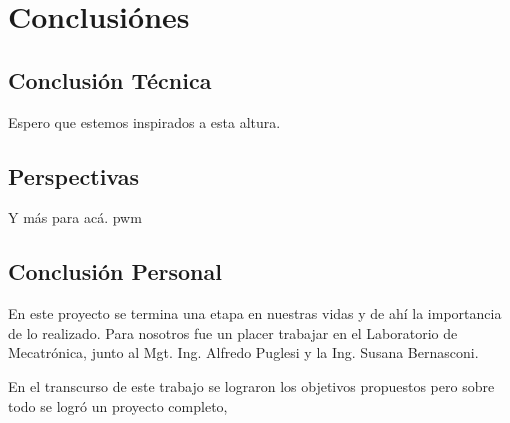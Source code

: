 \chapter{Conclusiónes}
\label{ch:conclusiones}

\section{Conclusión Técnica}
\label{sec:ConclusionTecnica}
Espero que estemos inspirados a esta altura. \cite{Gardner}


\section{Perspectivas}
\label{sec:Perspectivas}
Y más para acá. \gls{pwm}

\section{Conclusión Personal}
\label{sec:ConclusionPersonal}

En este proyecto se termina una etapa en nuestras vidas y de ahí la importancia
de lo realizado. Para nosotros fue un placer trabajar en el Laboratorio
de Mecatrónica, junto al Mgt. Ing. Alfredo Puglesi y la Ing. Susana Bernasconi.

En el transcurso de este trabajo se lograron los objetivos propuestos
pero sobre todo se logró un proyecto completo, 